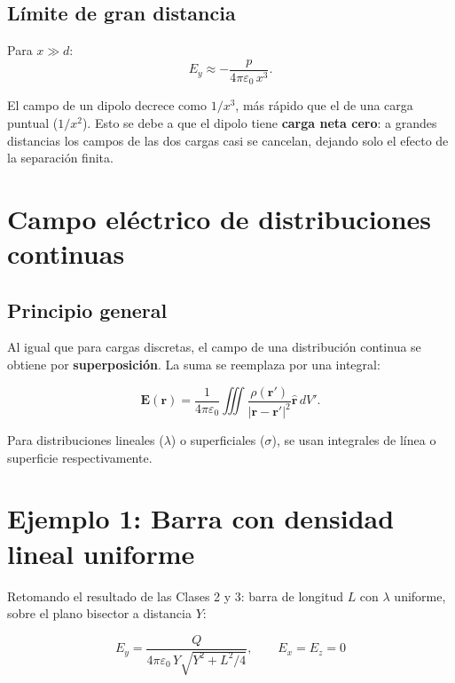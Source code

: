 \documentclass[12pt,a4paper]{article}
\begin{document}
\subsection{Límite de gran distancia}

Para $x \gg d$:
\[
E_y \approx -\frac{p}{4\pi\varepsilon_0 \, x^{3}}.
\]

\begin{warnbox}
  El campo de un dipolo decrece como $1/x^{3}$, más rápido que el de
  una carga puntual ($1/x^{2}$). Esto se debe a que el dipolo tiene
  \textbf{carga neta cero}: a grandes distancias los campos de las dos
  cargas casi se cancelan, dejando solo el efecto de la separación
  finita.
\end{warnbox}

\section{Campo eléctrico de distribuciones continuas}

\subsection{Principio general}

Al igual que para cargas discretas, el campo de una distribución
continua se obtiene por \textbf{superposición}. La suma se reemplaza
por una integral:

\[
\mathbf{E}(\mathbf{r}) =
\frac{1}{4\pi\varepsilon_0}
\iiint \frac{\rho(\mathbf{r}')}
           {|\mathbf{r} - \mathbf{r}'|^{2}}
        \hat{\mathbf{r}} \, dV'.
\]

Para distribuciones lineales ($\lambda$) o superficiales ($\sigma$),
se usan integrales de línea o superficie respectivamente.

\section{Ejemplo 1: Barra con densidad lineal uniforme}

Retomando el resultado de las Clases 2 y 3: barra de longitud $L$ con
$\lambda$ uniforme, sobre el plano bisector a distancia $Y$:

\[
E_y = \frac{Q}{4\pi\varepsilon_0 \,
              Y \sqrt{Y^{2} + L^{2}/4}},
\qquad E_x = E_z = 0
\]
\end{document}
